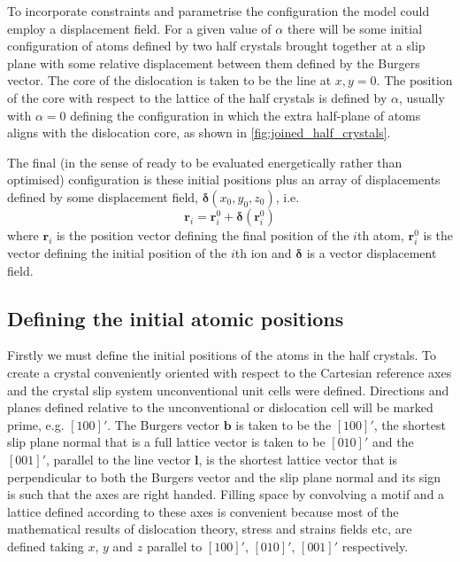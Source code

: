 To incorporate constraints and parametrise the configuration the model could employ a displacement field. For a given value of $\alpha$ there will be some initial configuration of atoms defined by two half crystals brought together at a slip plane with some relative displacement between them defined by the Burgers vector. The core of the dislocation is taken to be the line at $x,y = 0$. The position of the core with respect to the lattice of the half crystals is defined by $\alpha$, usually with $\alpha=0$ defining the configuration in which the extra half-plane of atoms aligns with the dislocation core, as shown in \autoref{fig:joined_half_crystals}. 

The final (in the sense of ready to be evaluated energetically rather than optimised) configuration is these initial positions plus an array of displacements defined by some displacement field, $\bm{\delta}(x_0, y_0, z_0)$, i.e.
\begin{equation}
\mathbf{r}_i = \mathbf{r}_i^0 + \bm{\delta}(\bm{r}_i^0)
\end{equation}
where $\mathbf{r}_i$ is the position vector defining the final position of the $i$th atom, $\mathbf{r}_i^0$ is the vector defining the initial position of the $i$th ion and $\bm{\delta}$ is a vector displacement field.


%
%
\subsection{Defining the initial atomic positions}


Firstly we must define the initial positions of the atoms in the half crystals. To create a crystal conveniently oriented with respect to the Cartesian reference axes and the crystal slip system unconventional unit cells were defined. Directions and planes defined relative to the unconventional or dislocation cell will be marked prime, e.g. $[100]'$. The Burgers vector $\mathbf{b}$ is taken to be the $[100]'$, the shortest slip plane normal that is a full lattice vector is taken to be $[010]'$ and the $[001]'$, parallel to the line vector $\mathbf{l}$, is the shortest lattice vector that is perpendicular to both the Burgers vector and the slip plane normal and its sign is such that the axes are right handed. Filling space by convolving a motif and a lattice defined according to these axes is convenient because most of the mathematical results of dislocation theory, stress and strains fields etc, are defined taking $x$, $y$ and $z$ parallel to $[100]'$, $[010]'$, $[001]'$ respectively.

